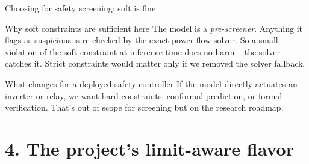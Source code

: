 \documentclass[aspectratio=169,10pt]{beamer}
\newcommand{\code}[1]{\texttt{#1}}
\begin{document}
\begin{frame}{Choosing for safety screening: soft is fine}
\centering
{}
\vspace{0.5em}
\begin{block}{Why soft constraints are sufficient here}
The model is a \emph{pre-screener}. Anything it flags as suspicious is re-checked by the exact power-flow solver. So a small violation of the soft constraint at inference time does no harm -- the solver catches it. Strict constraints would matter only if we removed the solver fallback.
\end{block}
\begin{alertblock}{What changes for a deployed safety controller}
If the model directly actuates an inverter or relay, we want hard constraints, conformal prediction, or formal verification. That's out of scope for screening but on the research roadmap.
\end{alertblock}
\end{frame}

\section*{4. The project's limit-aware flavor}
\end{document}
